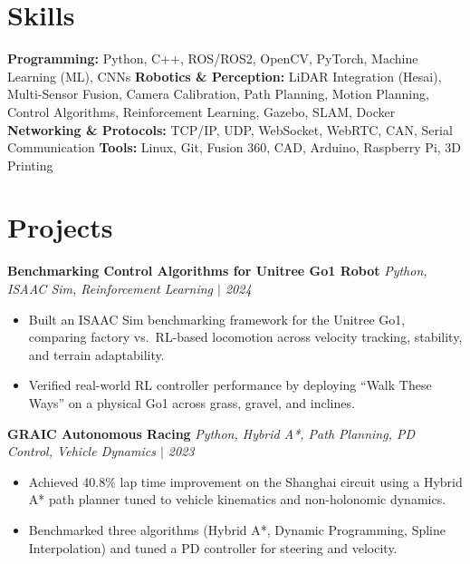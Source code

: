 \documentclass[9pt, a4paper]{article}
\newcommand{\projheader}[2]{%
  \textbf{#1} \hfill \textit{#2}%
}
\begin{document}
\section{Skills}
\textbf{Programming:} Python, C++, ROS/ROS2, OpenCV, PyTorch, Machine Learning (ML), CNNs \newline
\textbf{Robotics \& Perception:} LiDAR Integration (Hesai), Multi-Sensor Fusion, Camera Calibration, Path Planning, Motion Planning, Control Algorithms, Reinforcement Learning, Gazebo, SLAM, Docker \newline
\textbf{Networking \& Protocols:} TCP/IP, UDP, WebSocket, WebRTC, CAN, Serial Communication \newline
\textbf{Tools:} Linux, Git, Fusion 360, CAD, Arduino, Raspberry Pi, 3D Printing

\section{Projects}

\projheader{Benchmarking Control Algorithms for Unitree Go1 Robot}{Python, ISAAC Sim, Reinforcement Learning $|$ 2024}
\begin{itemize}[leftmargin=1.2em, topsep=2pt, itemsep=0pt, parsep=0pt]
  \item Built an ISAAC Sim benchmarking framework for the Unitree Go1, comparing factory vs.\ RL-based locomotion across velocity tracking, stability, and terrain adaptability.
  \item Verified real-world RL controller performance by deploying ``Walk These Ways'' on a physical Go1 across grass, gravel, and inclines.
\end{itemize}

\projheader{GRAIC Autonomous Racing}{Python, Hybrid A*, Path Planning, PD Control, Vehicle Dynamics $|$ 2023}
\begin{itemize}[leftmargin=1.2em, topsep=2pt, itemsep=0pt, parsep=0pt]
  \item Achieved 40.8\% lap time improvement on the Shanghai circuit using a Hybrid A* path planner tuned to vehicle kinematics and non-holonomic dynamics.
  \item Benchmarked three algorithms (Hybrid A*, Dynamic Programming, Spline Interpolation) and tuned a PD controller for steering and velocity.
\end{itemize}
\end{document}
